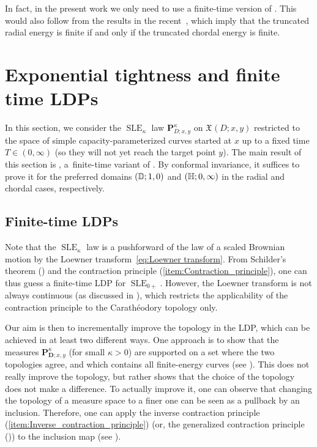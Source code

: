\documentclass[a4paper, 11pt]{article}
\theoremstyle{definition}
\numberwithin{equation}{section}
\numberwithin{figure}{section}
\newcommand{\SLE}[1][]{\operatorname{SLE}_{#1}}
\newcommand{\Xpaths}[1][]{\mathfrak{X}_{#1}}
\newcommand{\Ddomain}{\mathbf{D}}
\newcommand{\SLEmeasure}[2]{\mathbf{P}^{#2}_{\!\!#1}}
\begin{document}
In fact, in the present work we only need to use a finite-time version of .
This would also follow from the results in the recent~\cite{Krusell:in_prep}, which imply that the truncated radial energy is finite if and only if the truncated chordal energy is finite. %

\section{Exponential tightness and finite time LDPs} 
\label{sec:exponential-tightness}
In this section, we consider the $\SLE[\kappa]$ law $\SLEmeasure{D;x,y}{\kappa}$ on $\Xpaths(D; x, y)$ 
restricted to the space of simple capacity-parameterized curves started at $x$ up to a fixed time $T \in (0,\infty)$ 
(so they will not yet reach the target point $y$). 
The main result of this section is ,  
a~finite-time variant of . 
By conformal invariance, it suffices to prove it for 
the preferred domains $(\mathbb{D};1,0)$ and $(\mathbb{H};0,\infty)$ in the radial and chordal cases, respectively.


\subsection{Finite-time LDPs}\label{sec:large-deviations-preliminaries}

Note that the $\SLE[\kappa]$ law is a pushforward of the law of a scaled Brownian motion by the Loewner transform~\eqref{eq:Loewner transform}. 
From Schilder's theorem () and 
the contraction principle (\ref{item:Contraction_principle}), 
one can thus guess a finite-time LDP for $\SLE[0+]$. 
However, the Loewner transform is not always continuous 
(as discussed in ), which restricts the applicability of 
the contraction principle to the Carath\'eodory topology only. 


Our aim is then to incrementally improve the topology in the LDP, which can be achieved in at least two different ways. 
One approach is to show that the measures $\SLEmeasure{\Ddomain;x,y}{\kappa}$ (for small $\kappa > 0$) are supported on 
a set where the two topologies agree, and which contains all finite-energy curves (see ). 
This does not really improve the topology, but rather shows that the choice of the topology does not make a difference. 
To actually improve it, 
one can observe that changing the topology of a measure space to a finer one can be seen as a pullback by an inclusion. 
Therefore, one can apply the inverse contraction principle (\ref{item:Inverse_contraction_principle}) 
(or, the generalized contraction principle ()) 
to the inclusion map (see ).
\end{document}
